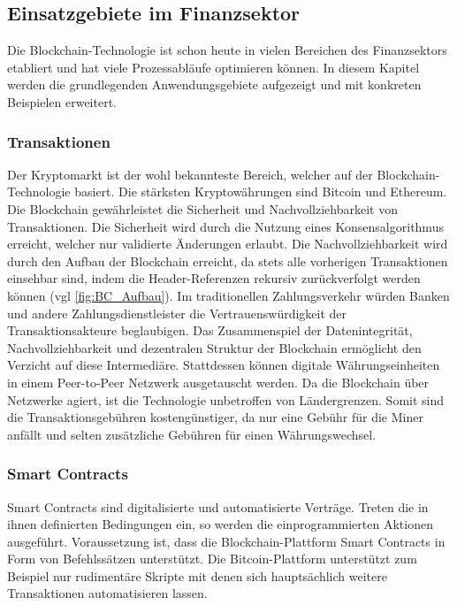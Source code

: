 \newpage
\subsection{Einsatzgebiete im Finanzsektor}
Die Blockchain-Technologie ist schon heute in vielen Bereichen des Finanzsektors etabliert und hat viele 
Prozessabläufe optimieren können. In diesem Kapitel werden die grundlegenden Anwendungsgebiete aufgezeigt
und mit konkreten Beispielen erweitert.

\subsubsection{Transaktionen}
Der Kryptomarkt ist der wohl bekannteste Bereich, welcher auf der Blockchain-Technologie basiert.
Die stärksten Kryptowährungen sind Bitcoin und Ethereum. 
Die Blockchain gewährleistet die Sicherheit und Nachvollziehbarkeit von Transaktionen. 
\cite[p.~168]{chowdhary2025smart}
Die Sicherheit wird durch die Nutzung eines Konsensalgorithmus erreicht, welcher nur validierte 
Änderungen erlaubt. Die Nachvollziehbarkeit wird  durch den Aufbau der Blockchain erreicht, da stets 
alle vorherigen Transaktionen einsehbar sind, indem die Header-Referenzen rekursiv zurückverfolgt
werden können (vgl \autoref{fig:BC_Aufbau}).
Im traditionellen Zahlungsverkehr würden Banken und andere Zahlungsdienstleister die 
Vertrauenswürdigkeit der Transaktionsakteure beglaubigen.
Das Zusammenspiel der Datenintegrität, Nachvollziehbarkeit und dezentralen Struktur der
Blockchain ermöglicht den Verzicht auf diese Intermediäre. Stattdessen können digitale 
Währungseinheiten in einem Peer-to-Peer Netzwerk ausgetauscht werden.
\cite[p.~32]{fill2020blockchain}
Da die Blockchain über Netzwerke agiert, ist die Technologie unbetroffen von Ländergrenzen.
Somit sind die Transaktionsgebühren kostengünstiger, da nur eine Gebühr für 
die Miner anfällt und selten zusätzliche Gebühren für einen Währungswechsel.
\cite[p.~167]{chowdhary2025smart}


\subsubsection{Smart Contracts}
\label{sec:SmartContracts}
Smart Contracts sind digitalisierte und automatisierte Verträge.
\cite[p.~14]{pirafelnerblockchaintechnologie}
Treten die in ihnen definierten Bedingungen ein, so werden die einprogrammierten Aktionen
ausgeführt.
\cite[p.~55f]{fill2020blockchain}
Voraussetzung ist, dass die Blockchain-Plattform Smart Contracts in Form von 
Befehlssätzen unterstützt. Die Bitcoin-Plattform unterstützt zum Beispiel nur rudimentäre
Skripte mit denen sich hauptsächlich weitere Transaktionen automatisieren lassen. 

